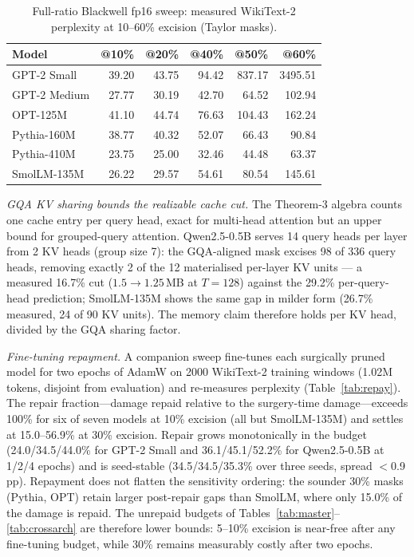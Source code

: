 \documentclass[10pt,journal,compsoc]{IEEEtran}
\begin{document}
\begin{table}[!t]
\caption{Full-ratio Blackwell fp16 sweep: measured WikiText-2 perplexity at
10--60\% excision (Taylor masks).}
\label{tab:fullratio}
\centering
\scriptsize
\setlength{\tabcolsep}{4pt}
\begin{tabular}{lrrrrr}
\toprule
Model & @10\% & @20\% & @40\% & @50\% & @60\% \\
\midrule
GPT-2 Small & 39.20 & 43.75 & 94.42 & 837.17 & 3495.51 \\
GPT-2 Medium & 27.77 & 30.19 & 42.70 & 64.52 & 102.94 \\
OPT-125M & 41.10 & 44.74 & 76.63 & 104.43 & 162.24 \\
Pythia-160M & 38.77 & 40.32 & 52.07 & 66.43 & 90.84 \\
Pythia-410M & 23.75 & 25.00 & 32.46 & 44.48 & 63.37 \\
SmolLM-135M & 26.22 & 29.57 & 54.61 & 80.54 & 145.61 \\
\bottomrule
\end{tabular}
\end{table}

\emph{GQA KV sharing bounds the realizable cache cut.} The Theorem-3 algebra
counts one cache entry per query head, exact for multi-head attention but an
upper bound for grouped-query attention. Qwen2.5-0.5B serves 14 query heads
per layer from 2 KV heads (group size 7): the GQA-aligned mask excises 98 of
336 query heads, removing exactly 2 of the 12 materialised per-layer KV
units --- a measured 16.7\% cut ($1.5{\to}1.25$\,MB at $T{=}128$) against the
29.2\% per-query-head prediction; SmolLM-135M
shows the same gap in milder form (26.7\% measured, 24 of 90 KV units). The
memory claim therefore holds per KV head, divided by the GQA sharing factor.

\emph{Fine-tuning repayment.} A companion sweep fine-tunes each surgically
pruned model for two epochs of AdamW on 2000 WikiText-2 training windows
(1.02M tokens, disjoint from evaluation) and re-measures perplexity
(Table~\ref{tab:repay}). The repair fraction---damage repaid relative to the
surgery-time damage---exceeds 100\% for six of seven models at 10\% excision
(all but SmolLM-135M) and settles at 15.0--56.9\% at 30\% excision. Repair
grows monotonically in the budget (24.0/34.5/44.0\% for GPT-2 Small and
36.1/45.1/52.2\% for Qwen2.5-0.5B at 1/2/4 epochs) and is seed-stable
(34.5/34.5/35.3\% over three seeds, spread $<$0.9 pp).
Repayment does not flatten the sensitivity ordering: the
sounder 30\% masks (Pythia, OPT) retain larger post-repair gaps than SmolLM,
where only 15.0\% of the damage is repaid. The unrepaid budgets of
Tables~\ref{tab:master}--\ref{tab:crossarch} are therefore lower bounds:
5--10\% excision is near-free after any fine-tuning budget, while 30\%
remains measurably costly after two epochs.
\end{document}
